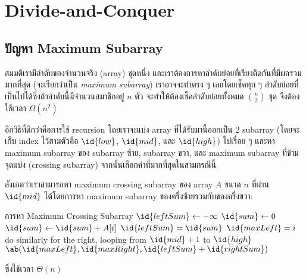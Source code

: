 \chapter{Divide-and-Conquer}

\section{ปัญหา Maximum Subarray}

สมมติเรามีลำดับของจำนวนจริง (array) ชุดหนึ่ง และเราต้องการหาลำดับย่อยที่เรียงติดกันที่มีผลรวมมากที่สุด (จะเรียกว่าเป็น \emph{maximum subarray}) เราอาจจะทำตรง ๆ เลยโดยเช็คทุก ๆ ลำดับย่อยที่เป็นไปได้ซึ่งถ้าลำดับนี้มีจำนวนสมาชิกอยู่ $n$ ตัว จะทำให้ต้องเช็คลำดับย่อยทั้งหมด $\binom{n}{2}$ ชุด จึงต้องใช้เวลา $\Omega(n^2)$

อีกวิธีที่ดีกว่าคือการใช้ recursion โดยเราจะแบ่ง array ที่ได้รับมานี้ออกเป็น 2 subarray (โดยจะเก็บ index ไว้สามตัวคือ $\id{low}$, $\id{mid}$, และ $\id{high}$) ไปเรื่อย ๆ และหา maximum subarray ของ subarray ซ้าย, subarray ขวา, และ maximum subarray ที่ข้ามจุดแบ่ง (crossing subarray) จากนั้นเลือกค่าที่มากที่สุดในสามกรณีนี้

สังเกตว่าเราสามารถหา maximum crossing subarray ของ array $A$ ขนาด $n$ ที่ผ่าน $\id{mid}$ ได้โดยการหา maximum subarray ของครึ่งซ้ายรวมกับของครึ่งขวา:
\begin{codebox}{การหา Maximum Crossing Subarray}
        \State $\id{leftSum} \gets -\infty$
        \State $\id{sum} \gets 0$
            \State $\id{sum} \gets \id{sum} + A[i]$
                \State $\id{leftSum} = \id{sum}$
                \State $\id{maxLeft} = i$
            \EndIf
        \EndFor
        \State do similarly for the right, looping from $\id{mid}+1$ to $\id{high}$
        \State \Return $\ab(\id{maxLeft}, \id{maxRight}, \id{leftSum} + \id{rightSum})$
    \EndFunction
\end{codebox}
ซึ่งใช้เวลา $\Theta(n)$

